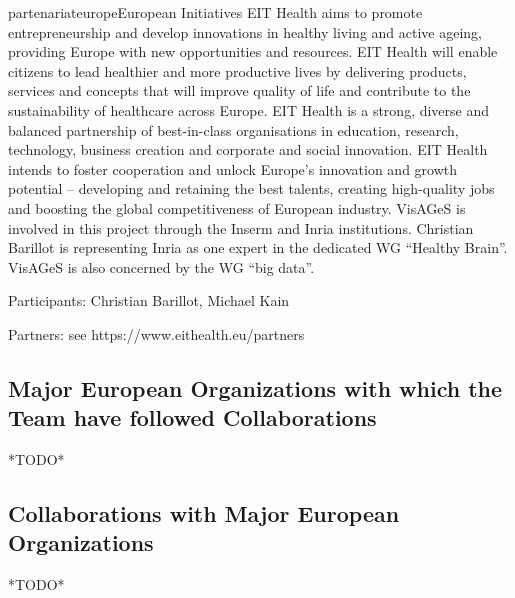 \documentclass{ra2018}
\begin{document}
\begin{module}{partenariat}{europe}{European Initiatives}
EIT Health aims to promote entrepreneurship and develop innovations in healthy living and active ageing, providing Europe with new opportunities and resources. EIT Health will enable citizens to lead healthier and more productive lives by delivering products, services and concepts that will improve quality of life and contribute to the sustainability of healthcare across Europe. EIT Health is a strong, diverse and balanced partnership of best-in-class organisations in education, research, technology, business creation and corporate and social innovation. EIT Health intends to foster cooperation and unlock Europe’s innovation and growth potential – developing and retaining the best talents, creating high-quality jobs and boosting the global competitiveness of European industry. VisAGeS is involved in this project through the Inserm and Inria institutions. Christian Barillot is representing Inria as one expert in the dedicated WG “Healthy Brain”. VisAGeS is also concerned by the WG “big data”.

    Participants: Christian Barillot, Michael Kain

    Partners: see https://www.eithealth.eu/partners



\subsection{Major European Organizations with which the Team have followed Collaborations}
*TODO*

\subsection{Collaborations with Major European Organizations}
*TODO*



\end{module}
\end{document}
